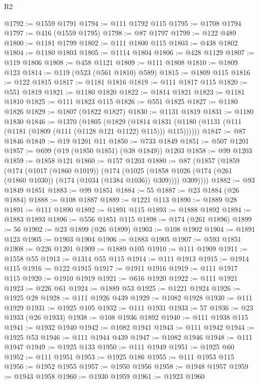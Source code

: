 \begin{lexlean}{R2}
\begin{coremodule}
{{{{{{{{{{{{{{{{{{{{{{{{{{{{{{{{{{{{{{{{{{{{{{{{{{{{{{{{{{{{{{{{{{{{{{{{{{{{{{{{{{{{{{{{{{{{{{{{{{{{{{{{{{{{{{{{{{{{{{{{{{{{{{{{{{{{{{{{{{{{@1792 := @1559 @1791
@1794 := @111 @1792 @115
@1795 := @1708 @1794
@1797 := @416 (@1559 @1795)
@1798 := @87 @1797
@1799 := @122 @489
@1800 := @1181 @1799
@1802 := @111 @1800 @115
@1803 := @438 @1802
@1804 := @1180 @1803
@1805 := @1114 @1804
@1806 := @428 @1129
@1807 := @119 @1806
@1808 := @458 @1121
@1809 := @111 @1808
@1810 := @1809 @123
@1814 := @119 (@523 (@561 @1810) @589)
@1815 := @1809 @115
@1816 := @122 @1815
@1817 := @1181 @1816
@1819 := @111 @1817 @115
@1820 := @551 @1819
@1821 := @1180 @1820
@1822 := @1814 @1821
@1823 := @1181 @1810
@1825 := @111 @1823 @115
@1826 := @551 @1825
@1827 := @1180 @1826
@1829 := @1807 (@1822 @1827)
@1830 := @1131 @1819
@1831 := @1180 @1830
@1846 := @1370
    (@1805
      (@1829
        (@1814 @1831 (@1180 (@1131 (@111 (@1181 (@1809 (@111 (@1128 @121 @1122) @115))) @115))))))
@1847 := @87 @1846
@1849 := @19 @1201 @11
@1850 := @733 @1849
@1851 := @507 @1201
@1857 := @699 (@19 (@1850 @1851) (@38 @1849)) @1203
@1858 := @99 @1203
@1859 := @1858 @121
@1860 := @157 @1203
@1880 := @87
    (@1857
      (@1859
        (@174
          (@1017 (@1860 @1019))
          (@174
            (@1025 (@1858 @1026 (@174 (@261 (@1860 @1030)) (@174 (@1034 (@1384 @1036)) @309))))
            @309))))
@1882 := @93 @1849 @1851
@1883 := @99 @1851
@1884 := 55
@1887 := @23 @1884 (@26 @1884)
@1888 := @108 @1887
@1889 := @1221 @113
@1890 := @1889 @28
@1891 := @111 @1890
@1892 := @1891 @115
@1893 := @1888 @1892
@1894 := @1883 @1893
@1896 := @556 @1851 @115
@1898 := @174 (@261 @1896)
@1899 := 56
@1902 := @23 @1899 (@26 @1899)
@1903 := @108 @1902
@1904 := @1891 @123
@1905 := @1903 @1904
@1906 := @1883 @1905
@1907 := @593 @1851
@1908 := @226 @1201
@1909 := @1889 @105
@1910 := @111 @1909
@1911 := @1558 @55
@1913 := @1314 @55 @115
@1914 := @111 @1913
@1915 := @1914 @115
@1916 := @122 @1915
@1917 := @1911 @1916
@1919 := @111 @1917 @115
@1920 := @1910 @1919
@1921 := @616 @1920
@1922 := @111 @1921
@1923 := @226 @61
@1924 := @1889 @53
@1925 := @1221 @1924
@1926 := @1925 @28
@1928 := @111 @1926 @439
@1929 := @1082 @1928
@1930 := @111 @1929
@1931 := @1925 @105
@1932 := @111 @1931
@1933 := 57
@1936 := @23 @1933 (@26 @1933)
@1938 := @108 @1936 @1892
@1940 := @111 @1938 @115
@1941 := @1932 @1940
@1942 := @1082 @1941
@1943 := @111 @1942
@1944 := @1925 @53
@1946 := @111 @1944 @439
@1947 := @1082 @1946
@1948 := @111 @1947
@1949 := @1925 @133
@1950 := @111 @1949
@1951 := @1925 @60
@1952 := @111 @1951
@1953 := @1925 @186
@1955 := @111 @1953 @115
@1956 := @1952 @1955
@1957 := @1950 @1956
@1958 := @1948 @1957
@1959 := @1943 @1958
@1960 := @1930 @1959
@1961 := @1923 @1960
}}}}}}}}}}}}}}}}}}}}}}}}}}}}}}}}}}}}}}}}}}}}}}}}}}}}}}}}}}}}}}}}}}}}}}}}}}}}}}}}}}}}}}}}}}}}}}}}}}}}}}}}}}}}}}}}}}}}}}}}}}}}}}}}}}}}}}}}}}}}
\end{coremodule}
\end{lexlean}
